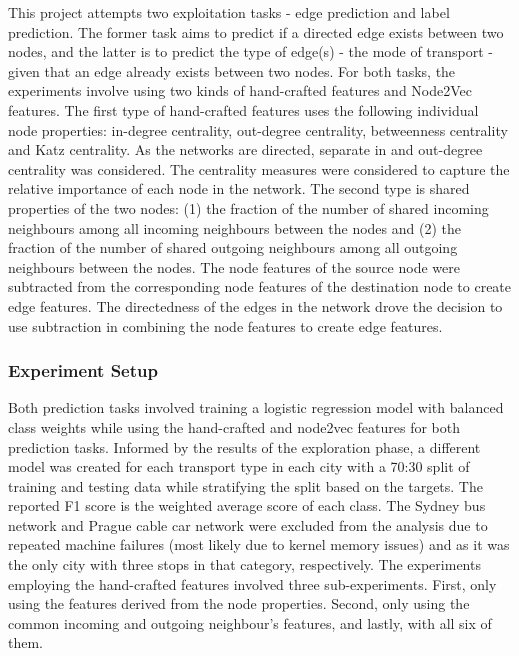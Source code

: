 \documentclass{article}
\theoremstyle{plain}
\theoremstyle{definition}
\theoremstyle{remark}
\begin{document}
This project attempts two exploitation tasks - edge prediction and label prediction. The former task aims to predict if a directed edge exists between two nodes, and the latter is to predict the type of edge(s) - the mode of transport - given that an edge already exists between two nodes. For both tasks, the experiments involve using two kinds of hand-crafted features and Node2Vec features. The first type of hand-crafted features uses the following individual node properties: in-degree centrality, out-degree centrality, betweenness centrality and Katz centrality. As the networks are directed, separate in and out-degree centrality was considered. The centrality measures were considered to capture the relative importance of each node in the network. The second type is shared properties of the two nodes: (1) the fraction of the number of shared incoming neighbours among all incoming neighbours between the nodes and (2) the fraction of the number of shared outgoing neighbours among all outgoing neighbours between the nodes. The node features of the source node were subtracted from the corresponding node features of the destination node to create edge features. The directedness of the edges in the network drove the decision to use subtraction in combining the node features to create edge features.

\subsubsection{Experiment Setup}
\label{setup}

Both prediction tasks involved training a logistic regression model with balanced class weights while using the hand-crafted and node2vec features for both prediction tasks. Informed by the results of the exploration phase, a different model was created for each transport type in each city with a 70:30 split of training and testing data while stratifying the split based on the targets. The reported F1 score is the weighted average score of each class. The Sydney bus network and Prague cable car network were excluded from the analysis due to repeated machine failures (most likely due to kernel memory issues) and as it was the only city with three stops in that category, respectively. The experiments employing the hand-crafted features involved three sub-experiments. First, only using the features derived from the node properties. Second, only using the common incoming and outgoing neighbour's features, and lastly, with all six of them. 
\end{document}
